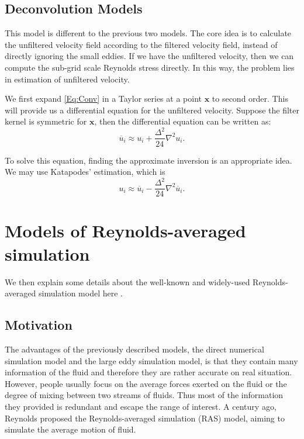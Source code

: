 \documentclass[english, nochinese]{pkupaper}
\begin{document}
\subsection{Deconvolution Models}

This model is different to the previous two models. The core idea is to calculate the unfiltered velocity field according to the filtered velocity field, instead of directly ignoring the small eddies. If we have the unfiltered velocity, then we can compute the sub-grid scale Reynolds stress directly. In this way, the problem lies in estimation of unfiltered velocity.

We first expand \eqref{Eq:Conv} in a Taylor series at a point $\mathbf{x}$ to second order. This will provide us a differential equation for the unfiltered velocity. Suppose the filter kernel is symmetric for $\mathbf{x}$, then the differential equation can be written as:
\begin{equation}
\overline{u}_i \approx u_i + \frac{\Delta^2}{24}\nabla^2u_i.
\end{equation}

To solve this equation, finding the approximate inversion is an appropriate idea. We may use Katapodes' estimation, which is
\begin{equation}
u_i \approx \overline{u}_i - \frac{\Delta^2}{24}\nabla^2\overline{u}_i.
\end{equation}

\section{Models of Reynolds-averaged simulation} \label{Sec:RAS}

We then explain some details about the well-known and widely-used Reynolds-averaged simulation model here \parencite{pope_turbulent_2001} \parencite{ferziger_computational_2002}.

\subsection{Motivation}

The advantages of the previously described models, the direct numerical simulation model and the large eddy simulation model, is that they contain many information of the fluid and therefore they are rather accurate on real situation. However, people usually focus on the average forces exerted on the fluid or the degree of mixing between two streams of fluids. Thus most of the information they provided is redundant and escape the range of interest. A century ago, Reynolds proposed the Reynolds-averaged simulation (RAS) model, aiming to simulate the average motion of fluid.
\end{document}

